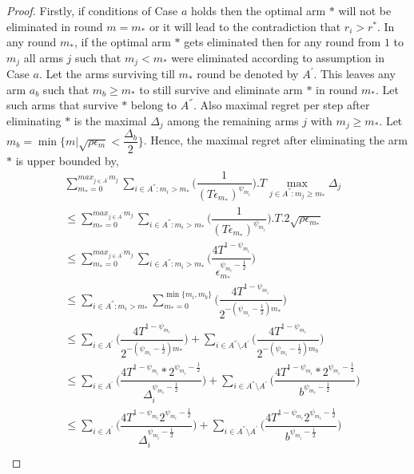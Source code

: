 \begin{proof}
	Firstly, if conditions of Case $a$ holds then the optimal arm ${*}$ will not be eliminated in round $m=m_{*}$ or it will lead to the contradiction that $r_{i}>r^{*}$. In any round $m_{*}$, if the optimal arm ${*}$ gets eliminated then for any round from $1$ to $m_{j}$ all arms ${j}$ such that $m_{j}< m_{*}$ were eliminated according to assumption in Case $a$. Let the arms surviving till $m_{*}$ round be denoted by $A^{'}$. This leaves any arm $a_{b}$ such that $m_{b}\geq m_{*}$ to still survive and eliminate arm ${*}$ in round $m_{*}$. Let such arms that survive ${*}$ belong to $A^{''}$. Also maximal regret per step after eliminating ${*}$ is the maximal $\Delta_{j}$ among the remaining arms ${j}$ with $m_{j}\geq m_{*}$.  Let $m_{b}=\min\lbrace m|\sqrt{\rho\epsilon_{m}}<\dfrac{\Delta_{b}}{2}\rbrace$. Hence, the maximal regret after eliminating the arm ${*}$ is upper bounded by, 
\begin{align*}
&\sum_{m_{*}=0}^{max_{j\in A^{'}}m_{j}}\sum_{i\in A^{''}:m_{i}>m_{*}}\bigg(\dfrac{1}{(  T\epsilon_{m_{*}})^{\psi_{m_i}}} \bigg).T\max_{j\in A^{''}:m_{j}\geq m_{*}}{\Delta}_{j}\\
&\leq\sum_{m_{*}=0}^{max_{j\in A^{'}}m_{j}}\sum_{i\in A^{''}:m_{i}>m_{*}}\bigg(\dfrac{1}{(  T\epsilon_{m_{*}})^{\psi_{m_i}}} \bigg).T.2\sqrt{\rho\epsilon_{m_{*}}}\\
&\leq\sum_{m_{*}=0}^{max_{j\in A^{'}}m_{j}}\sum_{i\in A^{''}:m_{i}>m_{*}}\bigg(\dfrac{4T^{1-\psi_{m_i}}}{\epsilon_{m_{*}}^{\psi_{m_i}-\frac{1}{2}}} \bigg)\\
&\leq\sum_{i\in A^{''}:m_{i}>m_{*}}\sum_{m_{*}=0}^{\min{\lbrace m_{i},m_{b}\rbrace}}\bigg(\dfrac{4T^{1-\psi_{m_i}}}{2^{-(\psi_{m_i}-\frac{1}{2})m_{*}}} \bigg)\\
&\leq\sum_{i\in A^{'}}\bigg(\dfrac{4T^{1-\psi_{m_i}}}{2^{-(\psi_{m_i}-\frac{1}{2})m_{*}}} \bigg)+\sum_{i\in A^{''}\setminus A^{'}}\bigg(\dfrac{4T^{1-\psi_{m_i}}}{2^{-(\psi_{m_i}-\frac{1}{2})m_{b}}} \bigg)\\
&\leq\sum_{i\in A^{'}}\bigg(\dfrac{4T^{1-\psi_{m_i}}*2^{\psi_{m_i}-\frac{1}{2}}}{\Delta_{i}^{\psi_{m_i}-\frac{1}{2}}} \bigg)+\sum_{i\in A^{''}\setminus A^{'}}\bigg(\dfrac{4T^{1-\psi_{m_i}}*2^{\psi_{m_i}-\frac{1}{2}}}{b^{\psi_{m_i}-\frac{1}{2}}} \bigg)\\
&\leq\sum_{i\in A^{'}}\bigg(\dfrac{4T^{1-\psi_{m_i}}2^{\psi_{m_i}-\frac{1}{2}}}{\Delta_{i}^{\psi_{m_i}-\frac{1}{2}}} \bigg)+\sum_{i\in A^{''}\setminus A^{'}}\bigg(\dfrac{4T^{1-\psi_{m_i}}2^{\psi_{m_i}-\frac{1}{2}}}{b^{\psi_{m_i}-\frac{1}{2}}} \bigg)\\
\end{align*}


\end{proof}
